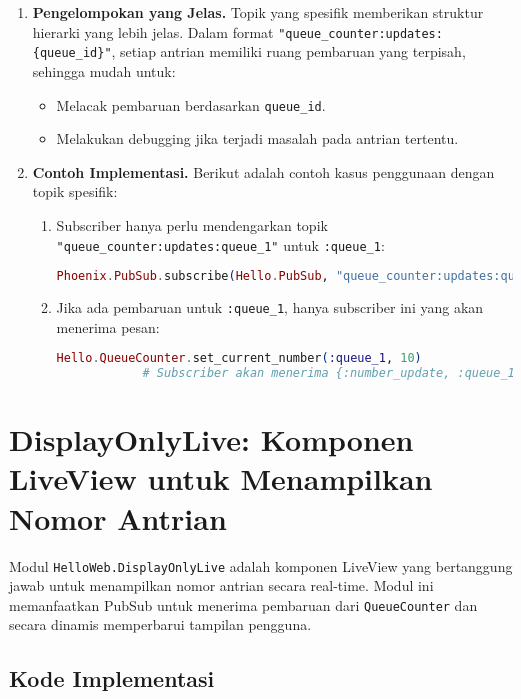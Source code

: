 \begin{enumerate}
	\item \textbf{Pengelompokan yang Jelas.} 
	Topik yang spesifik memberikan struktur hierarki yang lebih jelas. Dalam format \texttt{"queue\_counter:updates:\{queue\_id\}"}, setiap antrian memiliki ruang pembaruan yang terpisah, sehingga mudah untuk:
	\begin{itemize}
		\item Melacak pembaruan berdasarkan \texttt{queue\_id}.
		\item Melakukan debugging jika terjadi masalah pada antrian tertentu.
	\end{itemize}
	
	\item \textbf{Contoh Implementasi.} Berikut adalah contoh kasus penggunaan dengan topik spesifik:
	\begin{enumerate}
		\item Subscriber hanya perlu mendengarkan topik \texttt{"queue\_counter:updates:queue\_1"} untuk \texttt{:queue\_1}:
		\begin{lstlisting}[language=Elixir]
			Phoenix.PubSub.subscribe(Hello.PubSub, "queue_counter:updates:queue_1")
		\end{lstlisting}
		
		\item Jika ada pembaruan untuk \texttt{:queue\_1}, hanya subscriber ini yang akan menerima pesan:
		\begin{lstlisting}[language=Elixir]
			Hello.QueueCounter.set_current_number(:queue_1, 10)
			# Subscriber akan menerima {:number_update, :queue_1, 10}
		\end{lstlisting}
	\end{enumerate}
\end{enumerate}


\section{DisplayOnlyLive: Komponen LiveView untuk Menampilkan Nomor Antrian}

Modul \texttt{HelloWeb.DisplayOnlyLive} adalah komponen LiveView yang bertanggung jawab untuk menampilkan nomor antrian secara real-time. Modul ini memanfaatkan PubSub untuk menerima pembaruan dari \texttt{QueueCounter} dan secara dinamis memperbarui tampilan pengguna.

\subsection{Kode Implementasi}

